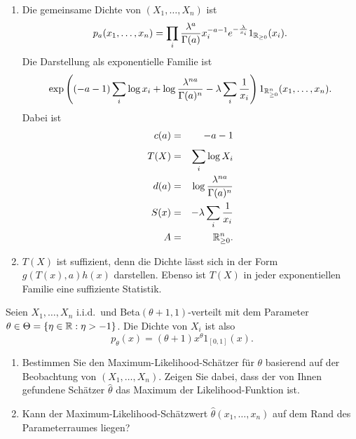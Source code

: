 \solution
\begin{enumerate}
    \item Die gemeinsame Dichte von $\left( X_1,\ldots,X_n \right)$ ist 
        \begin{equation*}
            p_a(x_1,\ldots,x_n) = 
            \prod_i \frac{\lambda^a}{\Gamma(a)}x_i^{-a-1} e^{-\frac{\lambda}{x_i}}1_{\mathbb R_{\geq 0}}(x_i).
        \end{equation*}
        Die Darstellung als exponentielle Familie ist
        \begin{equation*}
            \exp \left( \left( -a-1 \right) \sum_{i}^{} \log x_i + \log \frac{\lambda^{na}}{\Gamma(a)^n} - \lambda \sum_{i}^{} \frac{1}{x_i}  \right) 1_{\mathbb R_{\geq 0}^n} (x_1,\ldots,x_n).
        \end{equation*}
        Dabei ist 
        \begin{eqnarray*}
            c(a)&=&  -a-1 \\
            T(X)&=& \sum_{i}^{} \log X_i \\
            d(a)&=& \log \frac{\lambda^{na}}{\Gamma(a)^n} \\
            S(x)&=&  -\lambda \sum_{i}^{} \frac{1}{x_i}\\
            A   &=& \mathbb R_{\geq 0}^n.
        \end{eqnarray*}

    \item $T(X)$ ist suffizient, denn die Dichte lässt sich in der Form
        $g(T(x),a)h(x)$ darstellen. Ebenso ist $T(X)$ in jeder exponentiellen
        Familie eine suffiziente Statistik. 
\end{enumerate}



 Seien $X_1,\ldots,X_n$ i.i.d.\ und Beta$(\theta+1, 1)$-verteilt
mit dem Parameter $\theta\in\Theta= \left\{ \eta\in\mathbb R : \eta>-1 \right\}$. Die Dichte von $X_i$ ist also
\begin{equation*}
    p_\theta(x) = (\theta+1)x^\theta 1_{ [0,1] }(x).
\end{equation*}
\begin{enumerate}

    \item Bestimmen Sie den Maximum-Likelihood-Schätzer für $\theta$ basierend
        auf der Beobachtung von $\left( X_1,\ldots,X_n \right)$. Zeigen Sie
        dabei, dass der von Ihnen gefundene Schätzer $\hat \theta$ das Maximum
        der Likelihood-Funktion ist. 

    \item Kann der Maximum-Likelihood-Schätzwert $\hat \theta\left( x_1,\ldots,x_n \right)$
        auf dem Rand des Parameterraumes liegen? 
\end{enumerate}

